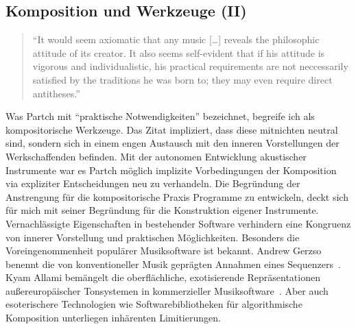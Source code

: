 \documentclass[12pt,a4paper,ngerman]{article}
\begin{document}
\subsection{Komposition und Werkzeuge (II)}
\label{compositionAndTools2}

\begin{quote}
    ``It would seem axiomatic that any music [\dots] reveals the philosophic attitude of its creator.
    It also seems self-evident that if his attitude is vigorous and individualistic, his practical requirements are not neccessarily satisfied by the traditions he was born to;
    they may even require direct antitheses.''~\parencite[S. 3]{genesisOfMusic}
\end{quote}

\noindent
Was Partch mit ``praktische Notwendigkeiten'' bezeichnet, begreife ich als kompositorische Werkzeuge.
Das Zitat impliziert, dass diese mitnichten neutral sind, sondern sich in einem engen Austausch mit den inneren Vorstellungen der Werkschaffenden befinden.
Mit der autonomen Entwicklung akustischer Instrumente war es Partch möglich implizite Vorbedingungen der Komposition via expliziter Entscheidungen neu zu verhandeln.
Die Begründung der Anstrengung für die kompositorische Praxis Programme zu entwickeln, deckt sich für mich mit seiner Begründung für die Konstruktion eigener Instrumente.
Vernachlässigte Eigenschaften in bestehender Software verhindern eine Kongruenz von innerer Vorstellung und praktischen Möglichkeiten.
Besonders die Voreingenommenheit populärer Musiksoftware ist bekannt.
Andrew Gerzso benennt die von konventioneller Musik geprägten Annahmen eines Sequenzers~\parencite[S. 78]{paradigmsAndComputerMusic}.
Kyam Allami bemängelt die oberflächliche, exotisierende Repräsentationen außereuropäischer Tonsystemen in kommerzieller Musiksoftware~\parencite[S. 59f]{microtonalityAndTheStruggle}.
Aber auch esoterischere Technologien wie Softwarebibliotheken für algorithmische Komposition unterliegen inhärenten Limitierungen.
\end{document}

